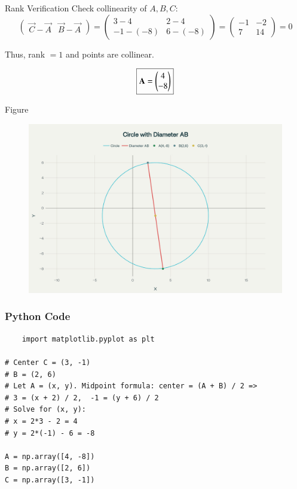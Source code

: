 \documentclass{beamer}
\begin{document}
\begin{frame}{Rank Verification}
   Check collinearity of \(A,B,C\):
\[
\begin{pmatrix}\vec C-\vec A & \vec B-\vec A\end{pmatrix}
=\begin{pmatrix}3-4 & 2-4\\ -1-(-8) & 6-(-8)\end{pmatrix}
=\begin{pmatrix}-1 & -2\\ 7 & 14\end{pmatrix} = 0
\]


Thus, rank \(=1\) and points are collinear.

\[
\boxed{\mathbf A=\begin{pmatrix}4\\-8\end{pmatrix}}
\]
 
\end{frame}

\begin{frame}{Figure}
  
\begin{figure}[H]
    \centering
    \includegraphics[width=0.5\linewidth]{figs/fig.png}
    \caption{}
    \label{fig:placeholder}
\end{figure}
  
\end{frame}

\begin{frame}[fragile]
    \frametitle{Python Code}
    \begin{lstlisting}
    import matplotlib.pyplot as plt

# Center C = (3, -1)
# B = (2, 6)
# Let A = (x, y). Midpoint formula: center = (A + B) / 2 =>
# 3 = (x + 2) / 2,  -1 = (y + 6) / 2
# Solve for (x, y):
# x = 2*3 - 2 = 4
# y = 2*(-1) - 6 = -8

A = np.array([4, -8])
B = np.array([2, 6])
C = np.array([3, -1])
\end{lstlisting}
\end{frame}
\end{document}
